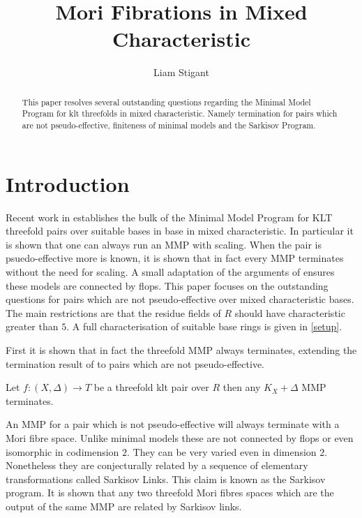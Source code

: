 \documentclass[a4paper,12pt]{amsart}
\title{Mori Fibrations in Mixed Characteristic}
\author{Liam Stigant}
\begin{document}
	
		
	\begin{abstract}
		This paper resolves several outstanding questions regarding the Minimal Model Program for klt threefolds in mixed characteristic. Namely termination for pairs which are not pseudo-effective, finiteness of minimal models and the Sarkisov Program. 
	\end{abstract}
		\maketitle
	\tableofcontents
	
	
	\section{Introduction}
	
	Recent work in \cite{bhatt2020globally+} establishes the bulk of the Minimal Model Program for KLT threefold pairs over suitable bases in base in mixed characteristic. In particular it is shown that one can always run an MMP with scaling. When the pair is psuedo-effective more is known, it is shown that in fact every MMP terminates without the need for scaling. A small adaptation of the arguments of \cite{kawamata2008flops} ensures these models are connected by flops. This paper focuses on the outstanding questions for pairs which are not pseudo-effective over mixed characteristic bases. The main restrictions are that the residue fields of $R$ should have characteristic greater than $5$. A full characterisation of suitable base rings is given in \autoref{setup}.
	
	
	
	First it is shown that in fact the threefold MMP always terminates, extending the termination result of \cite{bhatt2020globally+} to pairs which are not pseudo-effective.
	
	
	\begin{theorem}
		Let $f:(X,\Delta) \to T$ be a threefold klt pair over $R$ then any $K_{X}+\Delta$ MMP terminates.
	\end{theorem}

	An MMP for a pair which is not pseudo-effective will always terminate with a Mori fibre space. Unlike minimal models these are not connected by flops or even isomorphic in codimension $2$. They can be very varied even in dimension $2$. Nonetheless they are conjecturally related by a sequence of elementary transformations called Sarkisov Links. This claim is known as the Sarkisov program. It is shown that any two threefold Mori fibres spaces which are the output of the same MMP are related by Sarkisov links.
	
\end{document}
